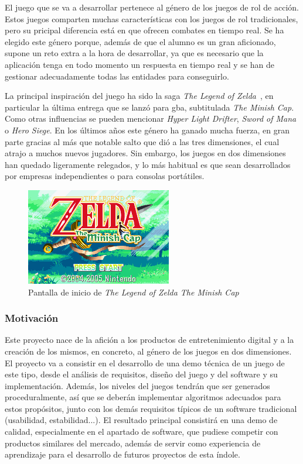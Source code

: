 			El juego que se va a desarrollar pertenece al género de los juegos de rol de acción. Estos juegos comparten muchas características con los juegos de rol tradicionales, pero su pricipal diferencia está en que ofrecen combates en tiempo real. Se ha elegido este género porque, además de que el alumno es un gran aficionado, supone un reto extra a la hora de desarrollar, ya que es necesario que la aplicación tenga en todo momento un respuesta en tiempo real y se han de gestionar adecuadamente todas las entidades para conseguirlo.

			La principal inspiración del juego ha sido la saga \textit{The Legend of Zelda}~\cite{zelda}, en particular la última entrega que se lanzó para \acrshort{gba}, subtitulada \textit{The Minish Cap}. Como otras influencias se pueden mencionar \textit{Hyper Light Drifter}, \textit{Sword of Mana} o \textit{Hero Siege}. En los últimos años este género ha ganado mucha fuerza, en gran parte gracias al más que notable salto que dió a las tres dimensiones, el cual atrajo a muchos nuevos jugadores. Sin embargo, los juegos en dos dimensiones han quedado ligeramente relegados, y lo más habitual es que sean desarrollados por empresas independientes o para consolas portátiles.

			\begin{figure}[!htp]
				 \centering
				 \includegraphics{fig/zelda}
				 \caption{Pantalla de inicio de \textit{The Legend of Zelda The Minish Cap}}
				 \label{fig:zelda}
			\end{figure}

			\FloatBarrier

		\subsubsection{Motivación}

			Este proyecto nace de la afición a los productos de entretenimiento digital y a la creación de los mismos, en concreto, al género de los juegos en dos dimensiones. El proyecto va a consistir en el desarrollo de una demo técnica de un juego de este tipo, desde el análisis de requisitos, diseño del juego y del software y su implementación. Además, los niveles del juegos tendrán que ser generados proceduralmente, así que se deberán implementar algoritmos adecuados para estos propósitos, junto con los demás requisitos típicos de un software tradicional (usabilidad, estabilidad...). El resultado principal consistirá en una demo de calidad, especialmente en el apartado de software, que pudiese competir con productos similares del mercado, además de servir como experiencia de aprendizaje para el desarrollo de futuros proyectos de esta índole.
